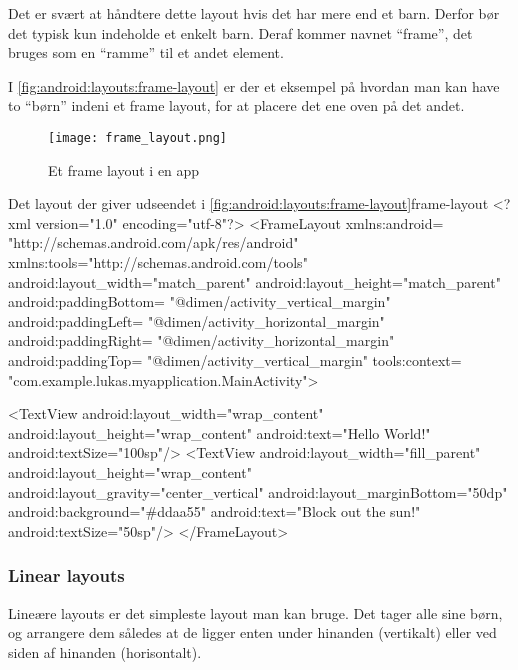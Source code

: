 Det er svært at håndtere dette layout hvis det har mere end et barn. Derfor bør 
det typisk kun indeholde et enkelt barn. Deraf kommer navnet ``frame'', det 
bruges som en ``ramme'' til et andet element.

I \autoref{fig:android:layouts:frame-layout} er der et eksempel på hvordan man 
kan have to ``børn'' indeni et frame layout, for at placere det ene oven på det 
andet.

\begin{figure}[h]
	\begin{center}
		\texttt{[image: frame\_layout.png]}
		\caption{Et frame layout i en app}
		\label{fig:android:layouts:frame-layout}
	\end{center}
\end{figure}

\clearpage

\begin{XmlCode}{Det layout der giver udseendet i \autoref{fig:android:layouts:frame-layout}}{frame-layout}
	<?xml version="1.0" encoding="utf-8"?>
	<FrameLayout 
		xmlns:android=
			"http://schemas.android.com/apk/res/android"
		xmlns:tools="http://schemas.android.com/tools"
		android:layout_width="match_parent"
		android:layout_height="match_parent"
		android:paddingBottom=
			"@dimen/activity_vertical_margin"
		android:paddingLeft=
			"@dimen/activity_horizontal_margin"
		android:paddingRight=
			"@dimen/activity_horizontal_margin"
		android:paddingTop=
			"@dimen/activity_vertical_margin"
		tools:context=
			"com.example.lukas.myapplication.MainActivity">
	
		<TextView
			android:layout_width="wrap_content"
			android:layout_height="wrap_content"
			android:text="Hello World!"
			android:textSize="100sp"/>
		<TextView
			android:layout_width="fill_parent"
			android:layout_height="wrap_content"
			android:layout_gravity="center_vertical"
			android:layout_marginBottom="50dp"
			android:background="#ddaa55"
			android:text="Block out the sun!"
			android:textSize="50sp"/>
	</FrameLayout>
\end{XmlCode}

\subsubsection{Linear layouts}
Lineære layouts er det simpleste layout man kan bruge. Det tager alle sine 
børn, og arrangere dem således at de ligger enten under hinanden (vertikalt) 
eller ved siden af hinanden (horisontalt).

